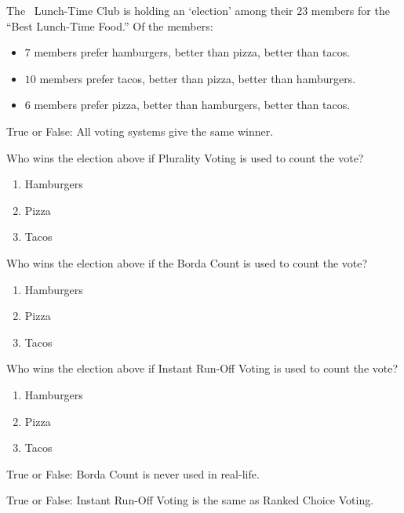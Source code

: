 \documentclass[nooutcomes,noauthor]{ximera}
\author{Bart Snapp}
\begin{document}
\maketitle

The \mooculus~Lunch-Time Club is holding an `election' among their
$23$ members for the ``Best Lunch-Time Food.'' Of the members:
\begin{itemize}
\item $7$ members prefer hamburgers, better than pizza, better than tacos. 
\item $10$ members prefer tacos, better than pizza, better than hamburgers. 
\item $6$ members prefer pizza, better than hamburgers, better than tacos.
\end{itemize}

\begin{exercise}
  True or False: All voting systems give the same winner.
 
\end{exercise}


\begin{exercise}
  Who wins the election above if Plurality Voting is used to count the
  vote?
  \begin{multicols}{3}
  \begin{enumerate}
  \item Hamburgers
  \item Pizza
  \item Tacos
  \end{enumerate}
  \end{multicols}
\end{exercise}



\begin{exercise}
  Who wins the election above if the Borda Count is used to count the
  vote?
  \begin{multicols}{3}
  \begin{enumerate}
  \item Hamburgers
  \item Pizza
  \item Tacos
  \end{enumerate}
  \end{multicols}
\end{exercise}



\begin{exercise}
  Who wins the election above if Instant Run-Off Voting is used to
  count the vote?
  \begin{multicols}{3}
  \begin{enumerate}
  \item Hamburgers
  \item Pizza
  \item Tacos
  \end{enumerate}
  \end{multicols}
\end{exercise}



\begin{exercise}
  True or False: Borda Count is never used in real-life.
\end{exercise}



\begin{exercise}
  True or False: Instant Run-Off Voting is the same as Ranked Choice Voting.
\end{exercise}


\end{document}
